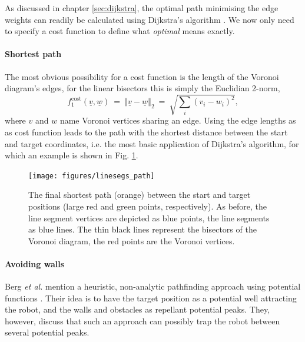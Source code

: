 As discussed in chapter \ref{sec:dijkstra}, the optimal path minimising the edge weights 
can readily be calculated using Dijkstra's algorithm \cite{wiki_dijkstra}.
We now only need to specify a cost function to define what \textit{optimal} means exactly.

\paragraph{Shortest path}
The most obvious possibility for a cost function is the length of the Voronoi diagram's edges, 
for the linear bisectors this is simply the Euclidian 2-norm,
\begin{equation}
	f^{\mathrm{cost}}_1\left(\underline{v}, \underline{w} \right) \ = \ 
	\left\Vert \underline{v} - \underline{w} \right\Vert_2 \ =\ \sqrt{\sum_i \left(v_i - w_i\right)^2},
\end{equation}
where $v$ and $w$ name Voronoi vertices sharing an edge.
Using the edge lengths as as cost function leads to the path with the shortest distance 
between the start and target coordinates, i.e. the most basic application of Dijkstra's algorithm,
for which an example is shown in Fig. \ref{fig:linesegs_path}.

\begin{figure}[h]
	\begin{center}
		\texttt{[image: figures/linesegs\_path]}
	\end{center}
	\caption[Path between a start and a target position.]{
		The final shortest path (orange) between the start and target positions (large red and green points, respectively).
		As before, the line segment vertices are depicted as blue points, the line segments as blue lines.
		The thin black lines represent the bisectors of the Voronoi diagram, the red points are the Voronoi vertices.
		\label{fig:linesegs_path}}
\end{figure}


\paragraph{Avoiding walls}
Berg \textit{et al.} mention a heuristic, non-analytic pathfinding approach using potential
functions \cite[p. 305]{Berg2008}. Their idea is to have the target position as a potential well attracting
the robot, and the walls and obstacles as repellant potential peaks. They, however, discuss
that such an approach can possibly trap the robot between several potential peaks.

